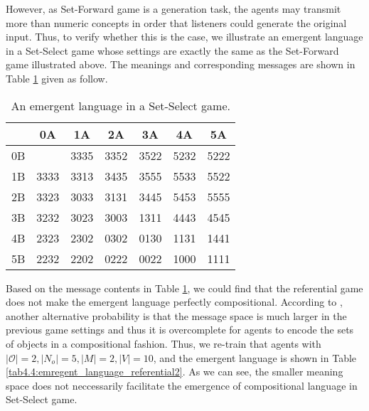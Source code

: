 However, as Set-Forward game is a generation task, the agents may transmit more than numeric concepts in order that listeners could generate the original input. Thus, to verify whether this is the case, we illustrate an emergent language in a Set-Select game whose settings are exactly the same as the Set-Forward game illustrated above. The meanings and corresponding messages are shown in Table \ref{tab4.3:emregent_language_referential} given as follow.

\begin{table}[!h]
    \centering
    \begin{tabular}{|c|c|c|c|c|c|c|}
        \hline
           & 0A   & 1A   & 2A   & 3A   & 4A   & 5A   \\ \hline
        0B &      & 3335 & 3352 & 3522 & 5232 & 5222 \\ \hline
        1B & 3333 & 3313 & 3435 & 3555 & 5533 & 5522 \\ \hline
        2B & 3323 & 3033 & 3131 & 3445 & 5453 & 5555 \\ \hline
        3B & 3232 & 3023 & 3003 & 1311 & 4443 & 4545 \\ \hline
        4B & 2323 & 2302 & 0302 & 0130 & 1131 & 1441 \\ \hline
        5B & 2232 & 2202 & 0222 & 0022 & 1000 & 1111 \\ \hline
        \end{tabular}
    \caption{An emergent language in a Set-Select game.}
    \label{tab4.3:emregent_language_referential}
\end{table}

Based on the message contents in Table \ref{tab4.3:emregent_language_referential}, we could find that the referential game does not make the emergent language perfectly compositional. According to \cite{kottur2017natural}, another alternative probability is that the message space is much larger in the previous game settings and thus it is overcomplete for agents to encode the sets of objects in a compositional fashion. Thus, we re-train that agents with $|\mathcal{O}|=2, |N_o|=5, |M|=2, |V|=10$, and the emergent language is shown in Table \ref{tab4.4:emregent_language_referential2}. As we can see, the smaller meaning space does not neccessarily facilitate the emergence of compositional language in Set-Select game.

